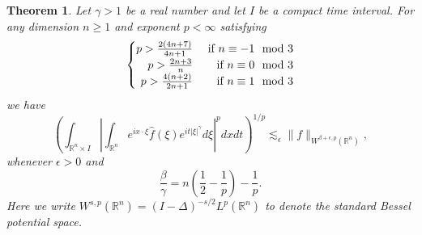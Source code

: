 \documentclass[12pt,leqno]{amsart}
\def\R{\mathbb{R}}
\def\beq{\begin{equation}}
\def\endeq{\end{equation}}
\def\lesim{\lesssim}
\theoremstyle{plain}
\newtheorem{thm}{Theorem}[section]
\numberwithin{equation}{section}
\begin{document}
\begin{thm}\label{180320thm1.6}
Let $\gamma>1$ be a real number and let $I$ be a compact time interval. For any dimension $n\ge 1$ and exponent $p < \infty$ satisfying 
\beq\label{p-exponent}
\begin{cases}
\hfill p>\frac{2(4n+7)}{4n+1}  & \hfill \text{ if } n\equiv -1 \mod 3\\
\hfill p>\frac{2n+3}{n}  & \hfill \text{ if } n\equiv 0 \mod 3\\
\hfill p>\frac{4(n+2)}{2n+1} & \hfill \text{ if } n\equiv 1 \mod 3
\end{cases}
\endeq
we have
\beq \label{eq:ls}
\left(\int_{\R^n\times I} \left| \int_{\R^n}e^{ix \cdot \xi}\hat{f}(\xi)e^{it|\xi|^{\gamma}} d\xi\right|^p dxdt\right)^{1/p} \lesim_{\epsilon} \|f\|_{W^{\beta+\epsilon,p}(\R^n)},
\endeq
whenever $\epsilon > 0$ and $$\frac{\beta}{\gamma}=n\left (\frac{1}{2}-\frac{1}{p}\right )-\frac{1}{p}.$$ Here we write $W^{s,p}(\R^n) = (I-\Delta)^{-s/2}L^p(\R^n)$ to denote the standard Bessel potential space.
\end{thm}
\end{document}
